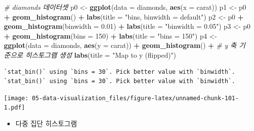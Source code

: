 \documentclass[
  11pt,
]{krantz}
\newenvironment{Shaded}{\begin{snugshade}}{\end{snugshade}}
\newcommand{\CommentTok}[1]{\textcolor[rgb]{0.37,0.37,0.37}{\textit{#1}}}
\newcommand{\DataTypeTok}[1]{\textcolor[rgb]{0.27,0.27,0.27}{#1}}
\newcommand{\DecValTok}[1]{\textcolor[rgb]{0.06,0.06,0.06}{#1}}
\newcommand{\FloatTok}[1]{\textcolor[rgb]{0.06,0.06,0.06}{#1}}
\newcommand{\KeywordTok}[1]{\textcolor[rgb]{0.27,0.27,0.27}{\textbf{#1}}}
\newcommand{\NormalTok}[1]{#1}
\newcommand{\OperatorTok}[1]{\textcolor[rgb]{0.43,0.43,0.43}{\textbf{#1}}}
\newcommand{\StringTok}[1]{\textcolor[rgb]{0.5,0.5,0.5}{#1}}
\providecommand{\tightlist}{%
  \setlength{\itemsep}{0pt}\setlength{\parskip}{0pt}}
\begin{document}
\begin{Shaded}
\begin{Highlighting}[]
\CommentTok{# diamonds 데이터셋}
\NormalTok{p0 <-}\StringTok{ }\KeywordTok{ggplot}\NormalTok{(}\DataTypeTok{data =}\NormalTok{ diamonds, }\KeywordTok{aes}\NormalTok{(}\DataTypeTok{x =}\NormalTok{ carat))}
\NormalTok{p1 <-}\StringTok{ }\NormalTok{p0 }\OperatorTok{+}\StringTok{ }\KeywordTok{geom_histogram}\NormalTok{() }\OperatorTok{+}\StringTok{ }
\StringTok{  }\KeywordTok{labs}\NormalTok{(}\DataTypeTok{title =} \StringTok{"bins, binwidth = default"}\NormalTok{)}
\NormalTok{p2 <-}\StringTok{ }\NormalTok{p0 }\OperatorTok{+}\StringTok{ }\KeywordTok{geom_histogram}\NormalTok{(}\DataTypeTok{binwidth =} \FloatTok{0.01}\NormalTok{) }\OperatorTok{+}\StringTok{ }
\StringTok{  }\KeywordTok{labs}\NormalTok{(}\DataTypeTok{title =} \StringTok{"binwidth = 0.05"}\NormalTok{)}
\NormalTok{p3 <-}\StringTok{ }\NormalTok{p0 }\OperatorTok{+}\StringTok{ }\KeywordTok{geom_histogram}\NormalTok{(}\DataTypeTok{bins =} \DecValTok{150}\NormalTok{) }\OperatorTok{+}\StringTok{ }
\StringTok{  }\KeywordTok{labs}\NormalTok{(}\DataTypeTok{title =} \StringTok{"bins = 150"}\NormalTok{)}
\NormalTok{p4 <-}\StringTok{ }\KeywordTok{ggplot}\NormalTok{(}\DataTypeTok{data =}\NormalTok{ diamonds, }\KeywordTok{aes}\NormalTok{(}\DataTypeTok{y =}\NormalTok{ carat)) }\OperatorTok{+}\StringTok{ }
\StringTok{  }\KeywordTok{geom_histogram}\NormalTok{() }\OperatorTok{+}\StringTok{ }\CommentTok{# y 축 기준으로 히스토그램 생성}
\StringTok{  }\KeywordTok{labs}\NormalTok{(}\DataTypeTok{title =} \StringTok{"Map to y (flipped)"}\NormalTok{)}
\end{Highlighting}
\end{Shaded}

\normalsize

\footnotesize

\begin{verbatim}
`stat_bin()` using `bins = 30`. Pick better value with `binwidth`.
`stat_bin()` using `bins = 30`. Pick better value with `binwidth`.
\end{verbatim}

\texttt{[image: 05-data-visualization\_files/figure-latex/unnamed-chunk-101-1.pdf]}

\normalsize

\begin{itemize}
\tightlist
\item
  다중 집단 히스토그램
\end{itemize}

\footnotesize
\end{document}
